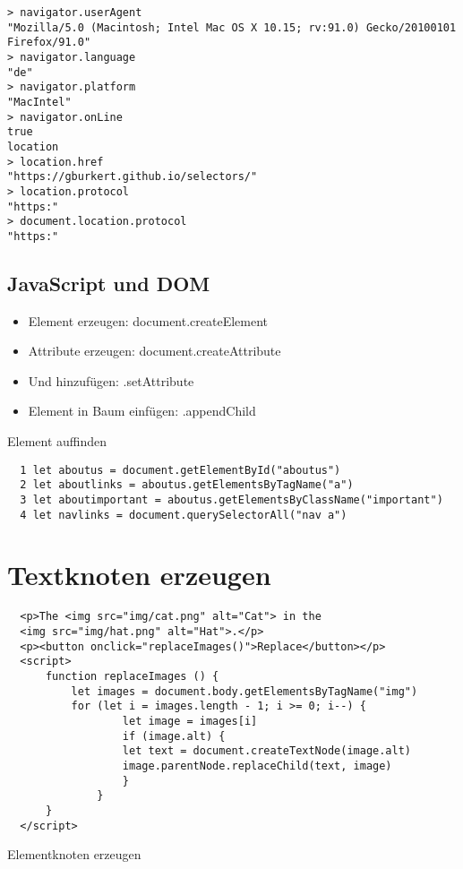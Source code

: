 \begin{verbatim}
> navigator.userAgent
"Mozilla/5.0 (Macintosh; Intel Mac OS X 10.15; rv:91.0) Gecko/20100101 Firefox/91.0"
> navigator.language
"de"
> navigator.platform
"MacIntel"
> navigator.onLine
true
location
> location.href
"https://gburkert.github.io/selectors/"
> location.protocol
"https:"
> document.location.protocol
"https:"
\end{verbatim}

\subsection{JavaScript und DOM}

\begin{itemize}
    \item Element erzeugen: document.createElement
    \item Attribute erzeugen: document.createAttribute
    \item Und hinzufügen: .setAttribute
    \item Element in Baum einfügen: .appendChild
  \end{itemize}
  
  Element auffinden
  
  \begin{verbatim}
  1 let aboutus = document.getElementById("aboutus")
  2 let aboutlinks = aboutus.getElementsByTagName("a")
  3 let aboutimportant = aboutus.getElementsByClassName("important")
  4 let navlinks = document.querySelectorAll("nav a")
  \end{verbatim}
  
  \section*{Textknoten erzeugen}
  \begin{verbatim}
  <p>The <img src="img/cat.png" alt="Cat"> in the
  <img src="img/hat.png" alt="Hat">.</p>
  <p><button onclick="replaceImages()">Replace</button></p>
  <script>
      function replaceImages () {
          let images = document.body.getElementsByTagName("img")
          for (let i = images.length - 1; i >= 0; i--) {
                  let image = images[i]
                  if (image.alt) {
                  let text = document.createTextNode(image.alt)
                  image.parentNode.replaceChild(text, image)
                  }
              }
      }
  </script>
  \end{verbatim}
  
  Elementknoten erzeugen
  
